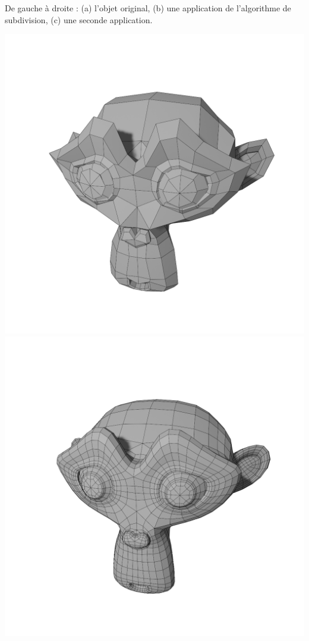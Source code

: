 \documentclass[11pt,class=report,crop=false]{standalone}
\begin{document}
De gauche à droite : (a) l'objet original, (b) une application de l'algorithme de subdivision, (c) une seconde application.
\begin{center}
 	\hspace*{-10mm}
	\includegraphics[scale=\myscale,scale=0.18,trim={5cm 0 4cm 0},clip,]{figures/singe-new-00}
	\includegraphics[scale=\myscale,scale=0.18,trim={5cm 0 4cm 0},clip,]{figures/singe-new-01}

\end{center}
\end{document}
